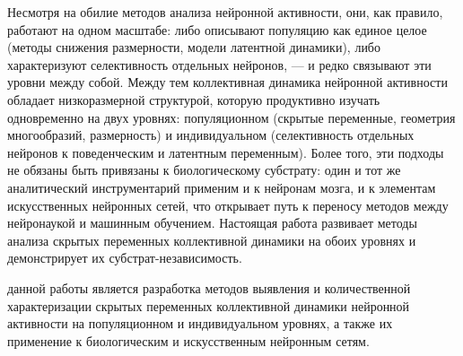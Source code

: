 %
%



Несмотря на обилие методов анализа нейронной активности, они, как правило,
работают на одном масштабе: либо описывают популяцию как единое целое (методы
снижения размерности, модели латентной динамики), либо характеризуют
селективность отдельных нейронов, --- и редко связывают эти уровни между собой.
Между тем коллективная динамика нейронной активности обладает низкоразмерной
структурой, которую продуктивно изучать одновременно на двух уровнях:
популяционном (скрытые переменные, геометрия многообразий, размерность) и
индивидуальном (селективность отдельных нейронов к поведенческим и латентным
переменным). Более того, эти подходы не обязаны быть привязаны к биологическому
субстрату: один и тот же аналитический инструментарий применим и к нейронам
мозга, и к элементам искусственных нейронных сетей, что открывает путь к
переносу методов между нейронаукой и машинным обучением. Настоящая работа
развивает методы анализа скрытых переменных коллективной динамики на обоих
уровнях и демонстрирует их субстрат-независимость.

{\aim} данной работы является разработка методов выявления и количественной
характеризации скрытых переменных коллективной динамики нейронной активности
на популяционном и индивидуальном уровнях, а также их применение к
биологическим и искусственным нейронным сетям.

